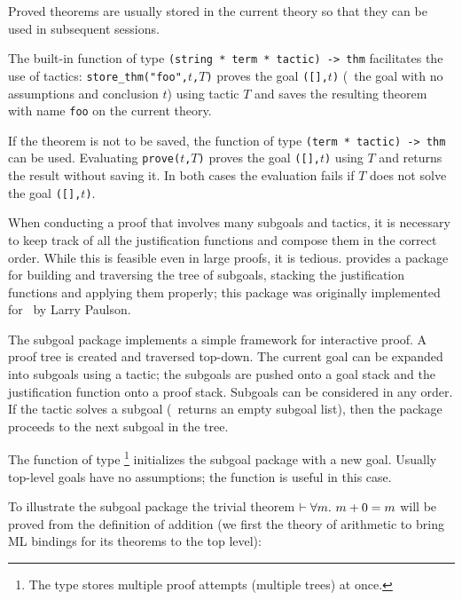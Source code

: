 \noindent Proved theorems are usually stored in the current theory
so that they can be used in subsequent sessions.

The built-in function
  of
\ML{} type {\small\verb|(string * term * tactic) -> thm|} facilitates the use
of tactics:
{\small\verb|store_thm("foo",|}$t${\small\verb|,|}$T${\small\verb|)|} proves
the goal   {\small\verb|([],|}$t${\small\verb|)|}   (\ie\  the   goal  with  no
assumptions and  conclusion  $t$)  using  tactic  $T$  and  saves the resulting
theorem with name {\small\verb|foo|} on the current theory.

If the theorem is not to be saved, the function  of type
{\small\verb|(term * tactic) -> thm|} can be used.  Evaluating
{\small\verb|prove(|}$t${\small\verb|,|}$T${\small\verb|)|} proves   the   goal
{\small\verb|([],|}$t${\small\verb|)|} using $T$ and returns the result without
saving it.  In both cases  the evaluation  fails if  $T$ does  not solve the
goal {\small\verb|([],|}$t${\small\verb|)|}.

When conducting a proof that involves many subgoals and tactics, it is
necessary to keep track of all the justification functions and compose
them in the correct order.  While this is feasible even in large
proofs, it is tedious.  \HOL{} provides a package for building and
traversing the tree of subgoals, stacking the justification functions
and applying them properly; this package was originally implemented
for \LCF\ by Larry Paulson.

The subgoal package implements a simple framework for interactive
proof. A proof tree is created and traversed top-down.  The current
goal can be expanded into subgoals using a tactic; the subgoals are
pushed onto a goal stack and the justification function onto a proof
stack.  Subgoals can be considered in any order.  If the tactic solves
a subgoal (\ie\ returns an empty subgoal list), then the package
proceeds to the next subgoal in the tree.

The function  of type \footnote{The
   type stores multiple proof attempts (multiple trees) at
  once.} initializes the subgoal package with a new goal. Usually
top-level goals have no assumptions; the function  is useful in
this case.

To illustrate the subgoal package the trivial theorem $\vdash
\forall m.\ m+0=m$ will be proved from the definition of addition (we
first  the theory of arithmetic to bring ML bindings for its
theorems to the top level):

